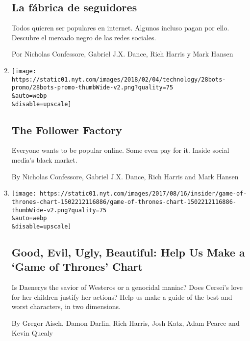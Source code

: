 \begin{enumerate}
  \hypertarget{la-fuxe1brica-de-seguidores}{%
  \subsection{La fábrica de
  seguidores}\label{la-fuxe1brica-de-seguidores}}

  Todos quieren ser populares en internet. Algunos incluso pagan por
  ello. Descubre el mercado negro de las redes sociales.

  Por Nicholas Confessore, Gabriel J.X. Dance, Rich Harris y Mark Hansen
\item
  \href{/interactive/2018/01/27/technology/social-media-bots.html}{}

  \texttt{[image: https://static01.nyt.com/images/2018/02/04/technology/28bots-promo/28bots-promo-thumbWide-v2.png?quality=75\\\&auto=webp\\\&disable=upscale]}

  \hypertarget{the-follower-factory}{%
  \subsection{The Follower Factory}\label{the-follower-factory}}

  Everyone wants to be popular online. Some even pay for it. Inside
  social media's black market.

  By Nicholas Confessore, Gabriel J.X. Dance, Rich Harris and Mark
  Hansen
\item
  \href{/interactive/2017/08/09/upshot/game-of-thrones-chart.html}{}

  \texttt{[image: https://static01.nyt.com/images/2017/08/16/insider/game-of-thrones-chart-1502212116886/game-of-thrones-chart-1502212116886-thumbWide-v2.png?quality=75\\\&auto=webp\\\&disable=upscale]}

  \hypertarget{good-evil-ugly-beautiful-help-us-make-a-game-of-thrones-chart}{%
  \subsection{Good, Evil, Ugly, Beautiful: Help Us Make a `Game of
  Thrones'
  Chart}\label{good-evil-ugly-beautiful-help-us-make-a-game-of-thrones-chart}}

  Is Daenerys the savior of Westeros or a genocidal maniac? Does
  Cersei's love for her children justify her actions? Help us make a
  guide of the best and worst characters, in two dimensions.

  By Gregor Aisch, Damon Darlin, Rich Harris, Josh Katz, Adam Pearce and
  Kevin Quealy
\end{enumerate}

